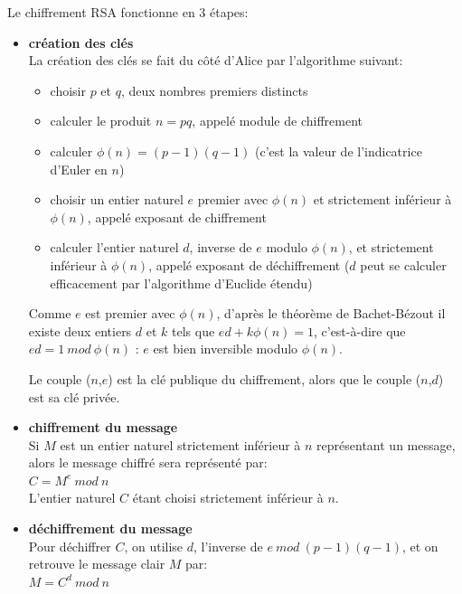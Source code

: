 Le chiffrement RSA fonctionne en 3 étapes:
\begin{itemize}
\item \textbf{création des clés} \\
La création des clés se fait du c\^oté d'Alice par l'algorithme suivant:
\begin{itemize}
\item choisir $p$ et $q$, deux nombres premiers distincts
\item calculer le produit $n = pq$, appelé module de chiffrement 
\item calculer $\phi(n) = (p - 1)(q -1)$ (c'est la valeur de l'indicatrice d'Euler en $n$) 
\item choisir un entier naturel $e$ premier avec $\phi(n)$ et strictement inférieur à  $\phi(n)$, appelé exposant de chiffrement
\item calculer l'entier naturel $d$, inverse de $e$ modulo  $\phi(n)$, et strictement inférieur à  $\phi(n)$, appelé exposant de déchiffrement ($d$ peut se calculer efficacement par l'algorithme d'Euclide étendu)
\end{itemize}
Comme $e$ est premier avec  $\phi(n)$, d'après le théorème de Bachet-Bézout il existe deux entiers $d$ et $k$ tels que $ed + k \phi(n) = 1$, c'est-à-dire que $ed = 1\ mod\ \phi(n)$ : $e$ est bien inversible modulo $\phi(n)$.

Le couple ($n$,$e$) est la clé publique du chiffrement, alors que le couple ($n$,$d$) est sa clé privée.

\item \textbf{chiffrement du message} \\
Si $M$ est un entier naturel strictement inférieur à $n$ représentant un message, alors le message chiffré sera représenté par: \\
$C = M^e\ mod\ n$ \\
L'entier naturel $C$ étant choisi strictement inférieur à $n$.

\item \textbf{déchiffrement du message} \\
Pour déchiffrer $C$, on utilise $d$, l'inverse de $e\ mod\ (p-1)(q-1)$, et on retrouve le message clair $M$ par: \\
$M = C^d\ mod\ n$ \\




\end{itemize}
